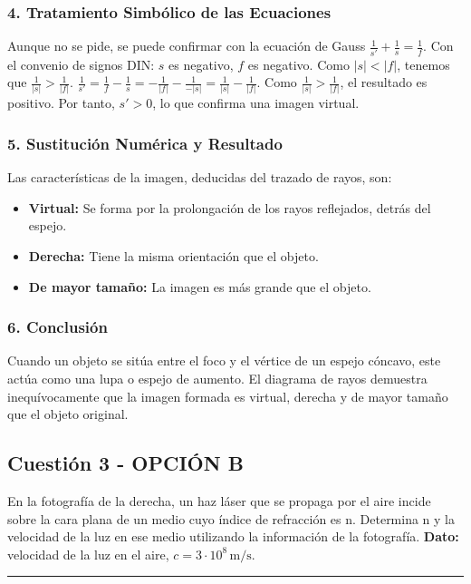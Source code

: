 \subsubsection*{4. Tratamiento Simbólico de las Ecuaciones}
Aunque no se pide, se puede confirmar con la ecuación de Gauss $\frac{1}{s'} + \frac{1}{s} = \frac{1}{f}$.
Con el convenio de signos DIN: $s$ es negativo, $f$ es negativo.
Como $|s| < |f|$, tenemos que $\frac{1}{|s|} > \frac{1}{|f|}$.
$\frac{1}{s'} = \frac{1}{f} - \frac{1}{s} = -\frac{1}{|f|} - \frac{1}{-|s|} = \frac{1}{|s|} - \frac{1}{|f|}$.
Como $\frac{1}{|s|} > \frac{1}{|f|}$, el resultado es positivo. Por tanto, $s' > 0$, lo que confirma una imagen virtual.

\subsubsection*{5. Sustitución Numérica y Resultado}
\begin{cajaresultado}
Las características de la imagen, deducidas del trazado de rayos, son:
\begin{itemize}
    \item \textbf{Virtual:} Se forma por la prolongación de los rayos reflejados, detrás del espejo.
    \item \textbf{Derecha:} Tiene la misma orientación que el objeto.
    \item \textbf{De mayor tamaño:} La imagen es más grande que el objeto.
\end{itemize}
\end{cajaresultado}

\subsubsection*{6. Conclusión}
\begin{cajaconclusion}
Cuando un objeto se sitúa entre el foco y el vértice de un espejo cóncavo, este actúa como una lupa o espejo de aumento. El diagrama de rayos demuestra inequívocamente que la imagen formada es virtual, derecha y de mayor tamaño que el objeto original.
\end{cajaconclusion}

\newpage

\subsection{Cuestión 3 - OPCIÓN B}
\label{subsec:3B_2015_jul_ext}

\begin{cajaenunciado}
En la fotografía de la derecha, un haz láser que se propaga por el aire incide sobre la cara plana de un medio cuyo índice de refracción es n. Determina n y la velocidad de la luz en ese medio utilizando la información de la fotografía.
\textbf{Dato:} velocidad de la luz en el aire, $c=3\cdot10^{8}\,\text{m/s}$.
\end{cajaenunciado}
\hrule

